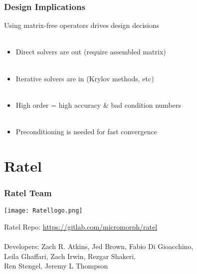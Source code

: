 \documentclass{beamer}
\begin{document}

\begin{frame}
\begin{center}
\frametitle{Design Implications}

Using matrix-free operators drives design decisions\\

~\\

\begin{itemize}

\item Direct solvers are out (require assembled matrix)\\

~\\

\item Iterative solvers are in (Krylov methods, etc)\\

~\\

\item High order = high accuracy \& bad condition numbers\\

~\\

\item Preconditioning is needed for fast convergence\\

\end{itemize}

\end{center}
\end{frame}

\section{Ratel}

\begin{frame}
\frametitle{Ratel Team}

\begin{center}
\texttt{[image: Ratellogo.png]}
\end{center}

{\flushleft

Ratel Repo: \href{https://gitlab.com/micromorph/ratel}{https://gitlab.com/micromorph/ratel}\\

~\\
Developers: Zach R. Atkins, Jed Brown, Fabio Di Gioacchino,\\
\hspace{19mm} Leila Ghaffari, Zach Irwin, Rezgar Shakeri,\\
\hspace{19mm} Ren Stengel, Jeremy L Thompson\\

~\\

}

\end{frame}
\end{document}
